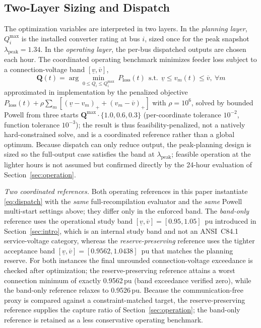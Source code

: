 \documentclass{ieeeaccess}
\newcommand{\SI}[2]{#1\,\ensuremath{\mathrm{#2}}}
\newcommand{\Qmax}{Q^{\max}}
\begin{document}
\subsection{Two-Layer Sizing and Dispatch}
The optimization variables are interpreted in two layers. In the
\emph{planning layer}, $\Qmax_i$ is the installed converter rating at bus $i$,
sized once for the peak snapshot $\lambda_{\mathrm{peak}}=1.34$. In the
\emph{operating layer}, the per-bus dispatched outputs are chosen each hour. The
coordinated operating benchmark minimizes feeder loss subject to a
connection-voltage band $[\underline v,\overline v]$,
\begin{equation}
\mathbf{Q}(t) = \arg\!\!\min_{0\le Q_i\le \Qmax_i}\ P_{\mathrm{loss}}(t)
\ \ \text{s.t.}\ \ \underline v\le v_m(t)\le \overline v,\ \forall m
\label{eq:dispatch}
\end{equation}
approximated in implementation by the penalized objective
$P_{\mathrm{loss}}(t)+\rho\sum_m[(\underline v-v_m)_+ + (v_m-\overline v)_+]$ with
$\rho=10^{6}$, solved by bounded Powell from three starts
$\mathbf Q^{\max}\!\cdot\!\{1.0,0.6,0.3\}$ (per-coordinate tolerance $10^{-2}$,
function tolerance $10^{-3}$); the result is thus feasibility-penalized, not a
natively hard-constrained solve, and is a coordinated reference rather than a
global optimum. Because dispatch can only reduce output, the peak-planning design
is sized so the full-output case satisfies the band at $\lambda_{\mathrm{peak}}$;
feasible operation at the lighter hours is not assumed but confirmed directly by
the 24-hour evaluation of Section~\ref{sec:operation}.

\emph{Two coordinated references.}\label{sec:coordrefs}
Both operating references in this paper instantiate \eqref{eq:dispatch} with the
\emph{same} full-recompilation evaluator and the \emph{same} Powell multi-start
settings above; they differ only in the enforced band. The \emph{band-only}
reference uses the operational study band $[\underline v,\overline v]=[0.95,1.05]$~pu
introduced in Section~\ref{sec:intro}, which is an internal study band and not an
ANSI~C84.1 service-voltage category, whereas the \emph{reserve-preserving} reference
uses the tighter acceptance band $[\underline v,\overline v]=[0.9562,1.0438]$~pu that
matches the planning reserve. For both instances the final unrounded connection-voltage exceedance is
checked after optimization; the reserve-preserving reference attains a worst
connection minimum of exactly \SI{0.9562}{pu} (band exceedance verified zero),
while the band-only reference relaxes to \SI{0.9526}{pu}. Because the
communication-free proxy is compared against a constraint-matched target, the
reserve-preserving reference supplies the capture ratio of
Section~\ref{sec:operation}; the band-only reference is retained as a less
conservative operating benchmark.
\end{document}
